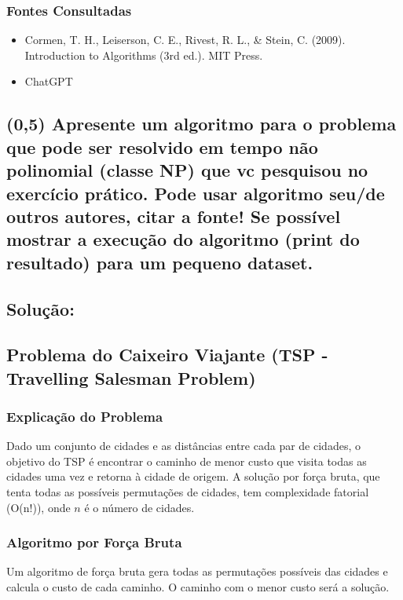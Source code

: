 \documentclass{article}
\begin{document}
\subsubsection{Fontes Consultadas}
\begin{itemize}
    \item Cormen, T. H., Leiserson, C. E., Rivest, R. L., \& Stein, C. (2009). Introduction to Algorithms (3rd ed.). MIT Press.
    \item ChatGPT 
\end{itemize}





\subsection {(0,5) Apresente um algoritmo para o problema que pode ser resolvido em tempo não
polinomial (classe NP) que vc pesquisou no exercício prático. Pode usar algoritmo
seu/de outros autores, citar a fonte! Se possível mostrar a execução do algoritmo
(print do resultado) para um pequeno dataset.}

\subsection*{Solução:}
\subsection*{Problema do Caixeiro Viajante (TSP - Travelling Salesman Problem)}

\subsubsection{Explicação do Problema}
Dado um conjunto de cidades e as distâncias entre cada par de 
cidades, o objetivo do TSP é encontrar o caminho de menor custo que 
visita todas as cidades uma vez e retorna à cidade de origem. 
A solução por força bruta, que tenta todas as possíveis permutações 
de cidades, tem complexidade fatorial (O(n!)), onde $n$ é o número de 
cidades.

\subsubsection{Algoritmo por Força Bruta}
Um algoritmo de força bruta gera todas as permutações possíveis das 
cidades e calcula o custo de cada caminho. O caminho com o menor 
custo será a solução.
\end{document}
